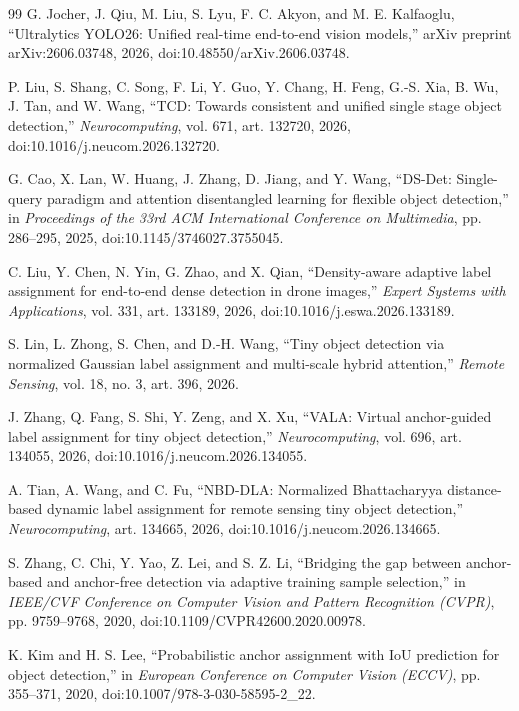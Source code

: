 \begin{thebibliography}{99}
G. Jocher, J. Qiu, M. Liu, S. Lyu, F. C. Akyon, and M. E. Kalfaoglu,
``Ultralytics YOLO26: Unified real-time end-to-end vision models,''
arXiv preprint arXiv:2606.03748, 2026,
doi:10.48550/arXiv.2606.03748.

P. Liu, S. Shang, C. Song, F. Li, Y. Guo, Y. Chang, H. Feng, G.-S. Xia,
B. Wu, J. Tan, and W. Wang,
``TCD: Towards consistent and unified single stage object detection,''
\emph{Neurocomputing}, vol. 671, art. 132720, 2026,
doi:10.1016/j.neucom.2026.132720.

G. Cao, X. Lan, W. Huang, J. Zhang, D. Jiang, and Y. Wang,
``DS-Det: Single-query paradigm and attention disentangled learning for flexible object detection,''
in \emph{Proceedings of the 33rd ACM International Conference on Multimedia},
pp. 286--295, 2025, doi:10.1145/3746027.3755045.

C. Liu, Y. Chen, N. Yin, G. Zhao, and X. Qian,
``Density-aware adaptive label assignment for end-to-end dense detection in drone images,''
\emph{Expert Systems with Applications}, vol. 331, art. 133189, 2026,
doi:10.1016/j.eswa.2026.133189.

S. Lin, L. Zhong, S. Chen, and D.-H. Wang,
``Tiny object detection via normalized Gaussian label assignment and multi-scale hybrid attention,''
\emph{Remote Sensing}, vol. 18, no. 3, art. 396, 2026.

J. Zhang, Q. Fang, S. Shi, Y. Zeng, and X. Xu,
``VALA: Virtual anchor-guided label assignment for tiny object detection,''
\emph{Neurocomputing}, vol. 696, art. 134055, 2026,
doi:10.1016/j.neucom.2026.134055.

A. Tian, A. Wang, and C. Fu,
``NBD-DLA: Normalized Bhattacharyya distance-based dynamic label assignment for remote sensing tiny object detection,''
\emph{Neurocomputing}, art. 134665, 2026,
doi:10.1016/j.neucom.2026.134665.

S. Zhang, C. Chi, Y. Yao, Z. Lei, and S. Z. Li,
``Bridging the gap between anchor-based and anchor-free detection via adaptive training sample selection,''
in \emph{IEEE/CVF Conference on Computer Vision and Pattern Recognition (CVPR)}, pp. 9759--9768, 2020,
doi:10.1109/CVPR42600.2020.00978.

K. Kim and H. S. Lee,
``Probabilistic anchor assignment with IoU prediction for object detection,''
in \emph{European Conference on Computer Vision (ECCV)}, pp. 355--371, 2020,
doi:10.1007/978-3-030-58595-2\_22.


\end{thebibliography}
